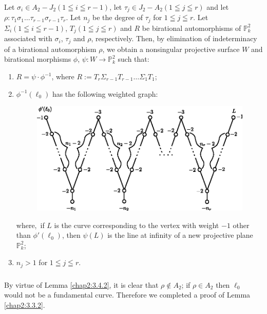 \begin{lemma*}
Let $\sigma_{i}\in A_{2}-J_{2}(1\leqq i\leqq r-1)$, let $\tau_{j}\in
J_{2}-A_{2}(1\leqq j\leqq r)$ and let
$\rho:\tau_{1}\sigma_{1}\ldots\tau_{r-1}\sigma_{r-1}\tau_{r}$. Let
$n_{j}$ be the degree of $\tau_{j}$ for $1\leqq j\leqq r$. Let
$\Sigma_{i}(1\leqq i\leqq r-1)$, $T_{j}(1\leqq j\leqq r)$ and $R$ be
birational automorphisms of $\mathbb{P}^{2}_{k}$ associated with
$\sigma_{i}$, $\tau_{j}$ and $\rho$, respectively. Then, by
elimination of indeterminacy of a birational automorphism $\rho$, we
obtain a nonsingular projective surface $W$ and birational morphisms
$\phi$, $\psi:W\to \mathbb{P}^{2}_{k}$ such that:
\begin{enumerate}
\renewcommand{\labelenumi}{\rm(\theenumi)}
\item $R=\psi\cdot\phi^{-1}$, where
  $R:=T_{r}\Sigma_{r-1}T_{r-1}\ldots\Sigma_{1}T_{1}$; 

\item $\phi^{-1}(\ell_{0})$ has the following weighted graph:
\begin{figure}[H]
\centering
\includegraphics[scale=.95]{figures/chap2-add-fig2.eps}
\end{figure}
where,\pageoriginale\ if $L$ is the curve corresponding to the vertex
with weight $-1$ other than $\phi'(\ell_{0})$, then $\psi(L)$ is the
line at infinity of a new projective plane $\mathbb{P}^{2}_{k}$;

\item $n_{j}>1$ for $1\leqq j\leqq r$.
\end{enumerate}
\end{lemma*}

\subsubsection{}\label{chap2:3.4.3}
By virtue of Lemma \ref{chap2:3.4.2}, it is clear that $\rho\not\in
A_{2}$; if $\rho\in A_{2}$ then $\ell_{0}$ would not be a fundamental
curve. Therefore we completed a proof of Lemma \ref{chap2:3.3.2}.

